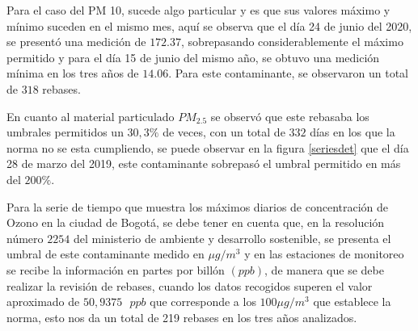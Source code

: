Para el caso del PM 10, sucede algo particular y es que sus valores máximo y mínimo suceden en el mismo mes, aquí se observa que el día 24 de junio del 2020, se presentó una medición de $172.37$, sobrepasando considerablemente el máximo permitido y para el día 15 de junio del mismo año, se obtuvo una medición mínima en los tres años de $14.06$. Para este contaminante, se observaron un total de $318$ rebases.

En cuanto al material particulado $PM_{2.5}$ se observó que este rebasaba los umbrales permitidos un $30,3\%$ de veces, con un total de $332$ días en los que la norma no se esta cumpliendo, se puede observar en la figura \ref{seriesdet} que el día 28 de marzo del 2019, este contaminante sobrepasó el umbral permitido en más del $200\%$. 




Para la serie de tiempo que muestra los máximos diarios de concentración de Ozono en la ciudad de Bogotá, se debe tener en cuenta que, en la resolución número $2254$ del ministerio de ambiente y desarrollo sostenible, se presenta el umbral de este contaminante medido en $\mu g / m^3$ y en las estaciones de monitoreo se recibe la información en partes por billón $(ppb)$, de manera que se debe realizar la revisión de rebases, cuando los datos recogidos superen el valor aproximado de $50,9375 \text{ } ppb$ que corresponde a los $100 \mu g / m^3$ que establece la norma, esto nos da un total de 219 rebases en los tres años analizados. 



